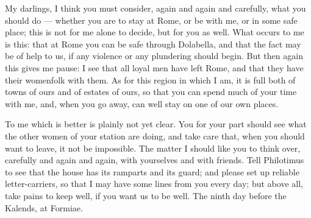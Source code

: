 

 My darlings, I think you must consider, again and again and carefully, what you should do --- whether you are to stay at Rome, or be with me, or in some safe place; this is not for me alone to decide, but for you as well. What occurs to me is this: that at Rome you can be safe through Dolabella, and that the fact may be of help to us, if any violence or any plundering should begin. But then again this gives me pause: I see that all loyal men have left Rome, and that they have their womenfolk with them. As for this region in which I am, it is full both of towns of ours and of estates of ours, so that you can spend much of your time with me, and, when you go away, can well stay on one of our own places.

 To me which is better is plainly not yet clear. You for your part should see what the other women of your station are doing, and take care that, when you should want to leave, it not be impossible. The matter I should like you to think over, carefully and again and again, with yourselves and with friends. Tell Philotimus to see that the house has its ramparts and its guard; and please set up reliable letter-carriers, so that I may have some lines from you every day; but above all, take pains to keep well, if you want us to be well. The ninth day before the Kalends, at Formiae.
